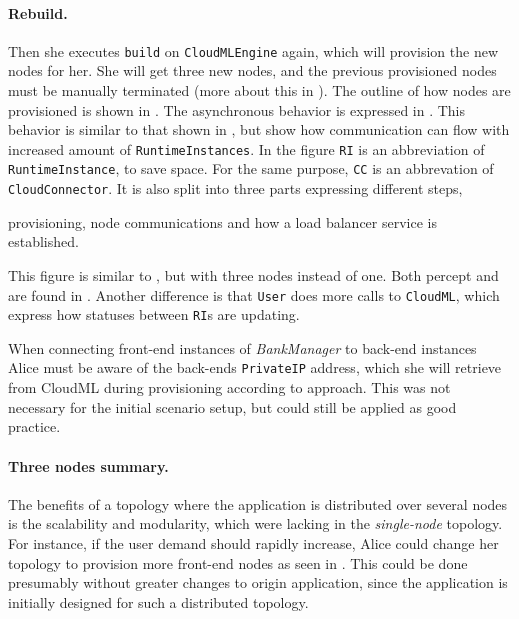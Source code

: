 \paragraph{Rebuild.}


Then she executes \texttt{build} on \texttt{CloudMLEngine} again,
which will provision the new nodes for her.
She will get three new nodes, and the previous provisioned nodes must be manually terminated
(more about this in ).
The outline of how nodes are provisioned is shown in .
The asynchronous behavior is expressed in .
This behavior is similar to that shown in ,
but show how communication can flow with increased amount of \texttt{RuntimeInstances}.
In the figure \texttt{RI} is an abbreviation of \texttt{RuntimeInstance}, to save space.
For the same purpose, \texttt{CC} is an abbrevation of \texttt{CloudConnector}.
It is also split into three parts expressing different steps, 
\begin{ii}
  \iitem provisioning, 
  \iitem node communications and
  \iitem how a load balancer service is established.
\end{ii}
This figure is similar to , but with three nodes instead of one.
Both percept  and  are found in .
Another difference is that \texttt{User} does more calls to \texttt{CloudML},
which express how statuses between \texttt{RI}s are updating.

When connecting front-end instances of \emph{BankManager} to back-end instances Alice must 
be aware of the back-ends \texttt{PrivateIP} address, which she will retrieve from CloudML
during provisioning according to  approach.
This was not necessary for the initial scenario setup, but could still be applied
as good practice.

\paragraph{Three nodes summary.}


The benefits of a topology where the application is distributed over several nodes 
is the scalability and modularity, which were lacking in the \emph{single-node} topology.
For instance, if the user demand should rapidly increase, Alice could change her topology to
provision more front-end nodes as seen in .
This could be done presumably without greater changes to origin application,
since the application is initially designed for such a distributed topology.


